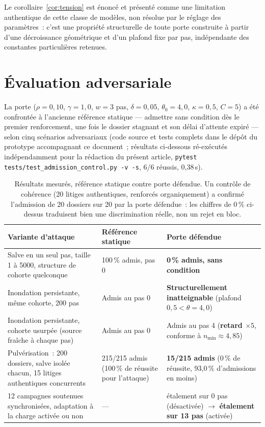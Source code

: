 \documentclass[11pt]{article}
\begin{document}
Le corollaire~\ref{cor:tension} est énoncé et présenté comme une
limitation authentique de cette classe de modèles, non résolue par le
réglage des paramètres~: c'est une propriété structurelle de toute porte
construite à partir d'une décroissance géométrique et d'un plafond fixe
par pas, indépendante des constantes particulières retenues.

\section{Évaluation adversariale}
\label{sec:eval}

La porte ($\rho=0{,}10$, $\gamma=1{,}0$, $w=3$ pas, $\delta=0{,}05$,
$\theta_0=4{,}0$, $\kappa=0{,}5$, $C=5$) a été confrontée à l'ancienne
référence statique --- admettre sans condition dès le premier
renforcement, une fois le dossier stagnant et son délai d'attente
expiré --- selon cinq scénarios adversariaux (code source et tests
complets dans le dépôt du prototype accompagnant ce document~; résultats
ci-dessous ré-exécutés indépendamment pour la rédaction du présent
article, \texttt{pytest tests/test\_admission\_control.py -v -s}, 6/6
réussis, 0{,}38\,s).

\begin{table}[h]
\centering
\small
\begin{tabular}{@{}p{4.0cm}p{4.6cm}p{4.6cm}@{}}
\toprule
Variante d'attaque & Référence statique & Porte défendue \\
\midrule
Salve en un seul pas, taille 1 à 5000, structure de cohorte quelconque
  & 100\,\% admis, pas 0 & \textbf{0\,\% admis, sans condition} \\
Inondation persistante, même cohorte, 200 pas
  & Admis au pas 0 & \textbf{Structurellement inatteignable} (plafond
    $0{,}5 < \theta{=}4{,}0$) \\
Inondation persistante, cohorte usurpée (source fraîche à chaque pas)
  & Admis au pas 0 & Admis au pas 4 (\textbf{retard $\times 5$}, conforme
    à $n_{\min}\!\approx\!4{,}85$) \\
Pulvérisation~: 200 dossiers, salve isolée chacun, 15 litiges
  authentiques concurrents
  & 215/215 admis (100\,\% de réussite pour l'attaque) &
    \textbf{15/215 admis} (0\,\% de réussite, 93{,}0\,\% d'admissions en
    moins) \\
12 campagnes soutenues synchronisées, adaptation à la charge activée ou
  non
  & --- & étalement sur 0 pas (désactivée) $\to$ \textbf{étalement sur
    13 pas} (activée) \\
\bottomrule
\end{tabular}
\caption{Résultats mesurés, référence statique contre porte défendue. Un
contrôle de cohérence (20 litiges authentiques, renforcés
organiquement) a confirmé l'admission de 20 dossiers sur 20 par la porte
défendue~: les chiffres de 0\,\% ci-dessus traduisent bien une
discrimination réelle, non un rejet en bloc.}
\end{table}
\end{document}
